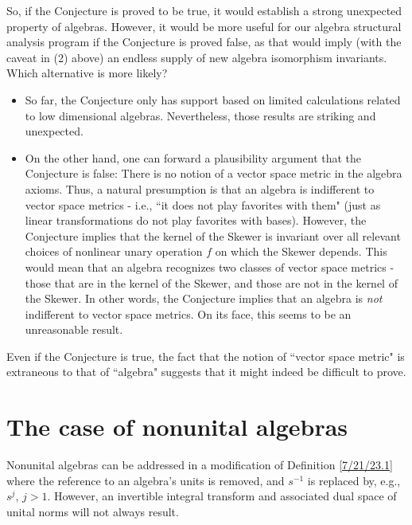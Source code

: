 \documentclass{amsart}
\numberwithin{equation}{section}
\theoremstyle{definition}
\numberwithin{theorem}{section}
\begin{document}
So, if the Conjecture is proved to be true, it would establish a strong unexpected property of algebras.  However, it would be more useful for our algebra structural analysis program if the Conjecture is proved false, as that would imply (with the caveat in (2) above) an endless supply of new algebra isomorphism invariants.  Which alternative is more likely? \begin{itemize} \item So far, the Conjecture only has support based on limited calculations related to low dimensional algebras.  Nevertheless, those results are striking and unexpected.  \item On the other hand, one can forward a plausibility argument that the Conjecture is false:  There is no notion of a vector space metric in the algebra axioms.  Thus, a natural presumption is that an algebra is indifferent to vector space metrics - i.e., ``it does not play favorites with them" (just as linear transformations do not play favorites with bases).  However, the Conjecture implies that the kernel of the Skewer is invariant over all relevant choices of nonlinear unary operation $f$ on which the Skewer depends.   This would mean that an algebra recognizes two classes of vector space metrics - those that are in the kernel of the Skewer, and those are not in the kernel of the Skewer.  In other words, the Conjecture implies that an algebra is {\it not} indifferent to vector space metrics.  On its face, this seems to be an unreasonable result.   
\end{itemize}

Even if the Conjecture is true, the fact that the notion of ``vector space metric" is extraneous to that of ``algebra" suggests that it might indeed be difficult to prove.  

\section{The case of nonunital algebras} Nonunital algebras can be addressed in a modification of Definition \ref{7/21/23.1} where the reference to an algebra's units is removed, and $s^{-1}$ is replaced by, e.g., $s^j$, $j>1$.   However, an invertible integral transform and associated dual space of unital norms will not always result.  
\end{document}
